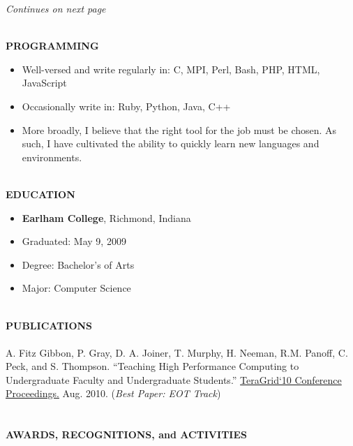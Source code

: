\documentclass[10pt]{article}
\begin{document}
\vfill
\begin{flushright}
\emph{Continues on next page}
\end{flushright}

\pagebreak

~\\
\textbf{PROGRAMMING}~\\
\vspace{-4mm}
\begin{itemize}
  \addtolength{\itemsep}{-2mm}
	\item \indent Well-versed and write regularly in: C, MPI, Perl, Bash, PHP, HTML, JavaScript
	\item \indent Occasionally write in: Ruby, Python, Java, C++
	\item \indent More broadly, I believe that the right tool for the job must be chosen. As such, I have cultivated the ability to quickly learn new languages and environments.
\end{itemize}
~\\
\textbf{EDUCATION}~\\
\vspace{-4mm}
\begin{itemize}
  \addtolength{\itemsep}{-2mm}
	\item[] \indent \textbf{Earlham College}, Richmond, Indiana
	\item[] \indent Graduated: May 9, 2009
	\item[] \indent Degree: Bachelor's of Arts
	\item[] \indent Major: Computer Science
\end{itemize}
~\\
\textbf{PUBLICATIONS}~\\
	~\\
	\indent A. Fitz Gibbon, P. Gray, D. A. Joiner, T. Murphy, H. Neeman, R.M. Panoff, C. Peck, and S. Thompson. ``Teaching High Performance Computing to Undergraduate Faculty and Undergraduate Students.'' \underline{TeraGrid`10 Conference Proceedings.} Aug. 2010. (\emph{Best Paper: EOT Track})
	~\\
~\\
~\\
\textbf{AWARDS, RECOGNITIONS, and ACTIVITIES}~\\
\vspace{-4mm}
\end{document}
